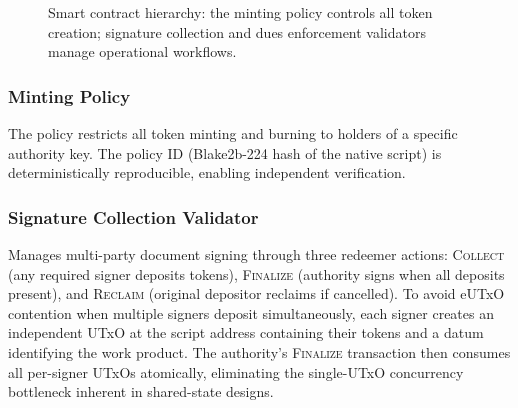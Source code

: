 \documentclass[conference,10pt]{IEEEtran}
\begin{document}
\begin{figure}[t]
\centering
{}
\caption{Smart contract hierarchy: the minting policy controls all token creation; signature collection and dues enforcement validators manage operational workflows.}
\label{fig:contracts}
\end{figure}

\subsubsection{Minting Policy} The policy restricts all token minting and burning to holders of a specific authority key. The policy ID (Blake2b-224 hash of the native script) is deterministically reproducible, enabling independent verification.

\subsubsection{Signature Collection Validator} Manages multi-party document signing through three redeemer actions: \textsc{Collect} (any required signer deposits tokens), \textsc{Finalize} (authority signs when all deposits present), and \textsc{Reclaim} (original depositor reclaims if cancelled). To avoid eUTxO contention when multiple signers deposit simultaneously, each signer creates an independent UTxO at the script address containing their tokens and a datum identifying the work product. The authority's \textsc{Finalize} transaction then consumes all per-signer UTxOs atomically, eliminating the single-UTxO concurrency bottleneck inherent in shared-state designs.
\end{document}
